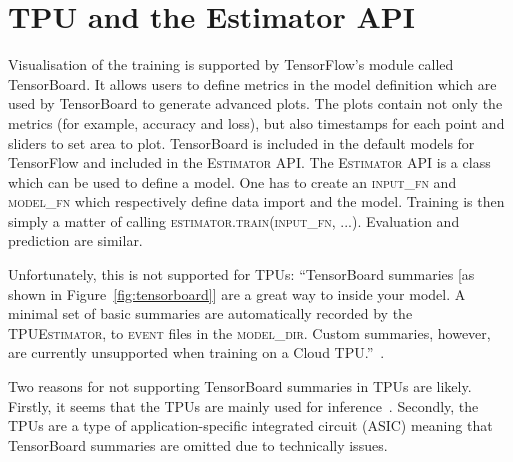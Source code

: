 \section{TPU and the Estimator API}
\label{sec:tpu_and_api}
Visualisation of the training is supported by TensorFlow's module called TensorBoard.
It allows users to define metrics in the model definition which are used by TensorBoard to generate advanced plots.
The plots contain not only the metrics (for example, accuracy and loss), but also timestamps for each point and sliders to set area to plot.
TensorBoard is included in the default models for TensorFlow and included in the \textsc{Estimator} API.
The \textsc{Estimator} API is a class which can be used to define a model.
One has to create an \textsc{input\_fn} and \textsc{model\_fn} which respectively define data import and the model.
Training is then simply a matter of calling \textsc{estimator.train(input\_fn, ...)}.
Evaluation and prediction are similar.

Unfortunately, this is not supported for TPUs:
``TensorBoard summaries [as shown in Figure~\ref{fig:tensorboard}] are a great way to inside your model.
A minimal set of basic summaries are automatically recorded by the \textsc{TPUEstimator}, to \textsc{event} files in the \textsc{model\_dir}.
Custom summaries, however, are currently unsupported when training on a Cloud TPU.''~\citep{google2019tpu}.

Two reasons for not supporting TensorBoard summaries in TPUs are likely.
Firstly, it seems that the TPUs are mainly used for inference~\citep{lakshmanan2018tpu}.
Secondly, the TPUs are a type of application-specific integrated circuit (ASIC) meaning that TensorBoard summaries are omitted due to technically issues.

